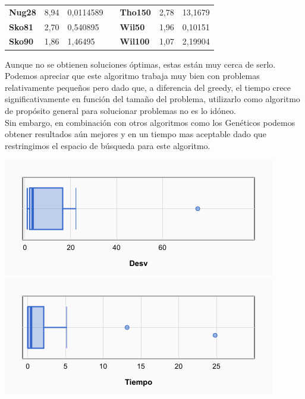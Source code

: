 \documentclass[a4paper, 12pt]{article}
\begin{document}
\begin{table}[H]
\begin{tabular}{|l|l|l|l|l|l|l|}
\textbf{Nug28}   & 8,94                               & 0,0114589                            &  & \textbf{Tho150}  & 2,78                               & 13,1679                              \\ \cline{1-3} \cline{5-7} 
\textbf{Sko81}   & 2,70                               & 0,540895                             &  & \textbf{Wil50}   & 1,96                               & 0,10151                              \\ \cline{1-3} \cline{5-7} 
\textbf{Sko90}   & 1,86                               & 1,46495                              &  & \textbf{Wil100}  & 1,07                               & 2,19904                              \\ \cline{1-3} \cline{5-7} 
\end{tabular}
\end{table}

      Aunque no se obtienen soluciones óptimas, estas están muy cerca de serlo. Podemos apreciar que este algoritmo trabaja muy bien con problemas relativamente pequeños pero dado que, a diferencia del greedy, el tiempo crece significativamente en función del tamaño del problema, utilizarlo como algoritmo de propósito general para solucionar problemas no es lo idóneo.\\
      
      Sin embargo, en combinación con otros algoritmos como los Genéticos podemos obtener resultados aún mejores y en un tiempo mas aceptable dado que restringimos el espacio de búsqueda para este algoritmo.

      \begin{center}
         \includegraphics[scale=0.5]{boxplot-bl-desv}
         \includegraphics[scale=0.5]{boxplot-bl-time}
      \end{center}
\end{document}
